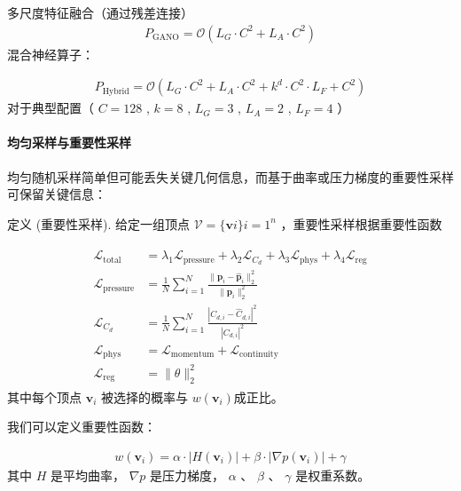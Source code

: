 \documentclass{MMCStyle}
\begin{document}
多尺度特征融合（通过残差连接）
    \begin{eqnarray} 
    P_{\mathrm{GANO}}=\mathcal{O}(L_{G}\cdot C^{2}+L_{A}\cdot C^{2})
    \end{eqnarray}
混合神经算子：

    \begin{eqnarray} 
    P_{\mathrm{Hybrid}}={\mathcal{O}}(L_{G}\cdot C^{2}+L_{A}\cdot C^{2}+k^{d}\cdot C^{2}\cdot L_{F}+C^{2})
    \end{eqnarray}
对于典型配置（ $C=128$ , $k=8$ , $L_{G}=3$ , $L_{A}=2$ , $L_{F}=4$ ）

 


        \paragraph{均匀采样与重要性采样}

      

均匀随机采样简单但可能丢失关键几何信息，而基于曲率或压力梯度的重要性采样可保留关键信息：  

定义 (重要性采样). 给定一组顶点 $\boldsymbol{\mathcal{V}}=\{\mathbf{v}{i}\}{i=1}^{n}$ ，重要性采样根据重要性函数


     \begin{eqnarray} 
    \begin{aligned}\mathcal{L}_{\mathrm{total}}&=\lambda_1\mathcal{L}_{\mathrm{pressure}}+\lambda_2\mathcal{L}_{C_d}+\lambda_3\mathcal{L}_{\mathrm{phys}}+\lambda_4\mathcal{L}_{\mathrm{reg}}\\\mathcal{L}_{\mathrm{pressure}}&=\frac{1}{N}\sum_{i=1}^N\frac{\|\mathbf{p}_i-\hat{\mathbf{p}}_i\|_2^2}{\|\mathbf{p}_i\|_2^2}\\\mathcal{L}_{C_{d}}&=\frac{1}{N}\sum_{i=1}^N\frac{|C_{d,i}-\hat{C}_{d,i}|^2}{|C_{d,i}|^2}\\\mathcal{L}_{\mathrm{phys}}&=\mathcal{L}_{\mathrm{momentum}}+\mathcal{L}_{\text{continuity}}\\\mathcal{L}_{\mathrm{reg}}&=\|\theta\|_2^2\end{aligned}
    \end{eqnarray}
 其中每个顶点 $\mathbf{v}_{i}$ 被选择的概率与 $w(\mathbf{v}_{i})$成正比。  

我们可以定义重要性函数：  

    \begin{eqnarray} 
    w(\mathbf{v}_{i})=\alpha\cdot|H(\mathbf{v}_{i})|+\beta\cdot|\nabla p(\mathbf{v}_{i})|+\gamma
    \end{eqnarray}
其中 $H$ 是平均曲率， $\nabla p$ 是压力梯度， $\alpha$ 、 $\beta$ 、 $\gamma$ 是权重系数。
\end{document}
